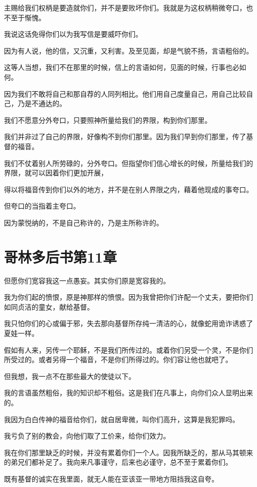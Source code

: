 \documentclass[12pt,oneside]{book}
\begin{document}
主赐给我们权柄是要造就你们，并不是要败坏你们。我就是为这权柄稍微夸口，也不至于惭愧。

我说这话免得你们以为我写信是要威吓你们。

因为有人说，他的信，又沉重，又利害。及至见面，却是气貌不扬，言语粗俗的。

这等人当想，我们不在那里的时候，信上的言语如何，见面的时候，行事也必如何。

因为我们不敢将自己和那自荐的人同列相比。他们用自己度量自己，用自己比较自己，乃是不通达的。

我们不愿意分外夸口，只要照神所量给我们的界限，构到你们那里。

我们并非过了自己的界限，好像构不到你们那里。因为我们早到你们那里，传了基督的福音。

我们不仗着别人所劳碌的，分外夸口。但指望你们信心增长的时候，所量给我们的界限，就可以因着你们更加开展，

得以将福音传到你们以外的地方，并不是在别人界限之内，藉着他现成的事夸口。

但夸口的当指着主夸口。

因为蒙悦纳的，不是自己称许的，乃是主所称许的。

\chapter{哥林多后书第11章}
但愿你们宽容我这一点愚妄。其实你们原是宽容我的。

我为你们起的愤恨，原是神那样的愤恨。因为我曾把你们许配一个丈夫，要把你们如同贞洁的童女，献给基督。

我只怕你们的心或偏于邪，失去那向基督所存纯一清洁的心，就像蛇用诡诈诱惑了夏娃一样。

假如有人来，另传一个耶稣，不是我们所传过的。或着你们另受一个灵，不是你们所受过的。或者另得一个福音，不是你们所得过的。你们容让他也就吧了。

但我想，我一点不在那些最大的使徒以下。

我的言语虽然粗俗，我的知识却不粗俗。这是我们在凡事上，向你们众人显明出来的。

我因为白白传神的福音给你们，就自居卑微，叫你们高升，这算是我犯罪吗。

我亏负了别的教会，向他们取了工价来，给你们效力。

我在你们那里缺乏的时候，并没有累着你们一个人。因我所缺乏的，那从马其顿来的弟兄们都补足了。我向来凡事谨守，后来也必谨守，总不至于累着你们。

既有基督的诚实在我里面，就无人能在亚该亚一带地方阻挡我这自夸。
\end{document}
